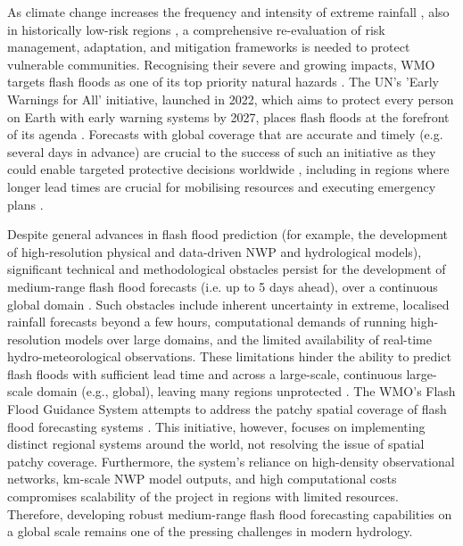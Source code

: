 As  climate change increases the frequency and intensity of extreme rainfall \citep{WMO_2025, IPCC_2023}, also in historically low-risk regions \citep{Fowler_2021c}, a comprehensive re-evaluation of risk management, adaptation, and mitigation frameworks is needed to protect vulnerable communities. Recognising their severe and growing impacts, WMO targets flash floods as one of its top priority natural hazards \citep{WMO_2025}. The UN's 'Early Warnings for All' initiative, launched in 2022, which aims to protect every person on Earth with early warning systems by 2027, places flash floods at the forefront of its agenda \citep{UN_2022}. Forecasts with global coverage that are accurate and timely (e.g. several days in advance) are crucial to the success of such an initiative as they could enable targeted protective decisions worldwide \citep{Merz_2020}, including in regions where longer lead times are crucial for mobilising resources and executing emergency plans \citep{Bazo_2019}. 

Despite  general advances in flash flood prediction (for example, the development of high-resolution physical and data-driven NWP and hydrological models), significant technical and methodological obstacles persist for the development of medium-range flash flood forecasts (i.e. up to 5 days ahead), over a continuous global domain \citep{Zanchetta_2020}. Such obstacles include inherent uncertainty in extreme, localised rainfall forecasts beyond a few hours, computational demands of running high-resolution models over large domains, and the limited availability of real-time hydro-meteorological observations. These limitations hinder the ability to predict flash floods with sufficient lead time and across a large-scale, continuous large-scale domain (e.g., global), leaving many regions unprotected \citep{AlRawas_2024}. The WMO's Flash Flood Guidance System attempts to address the patchy spatial coverage of flash flood forecasting systems \citep{Georgakakos_2022}. This initiative, however, focuses on implementing distinct regional systems around the world, not resolving the issue of spatial patchy coverage. Furthermore, the system's reliance on high-density observational networks, km-scale NWP model outputs, and high computational costs compromises scalability of the project in regions with limited resources. Therefore, developing robust medium-range flash flood forecasting capabilities on a global scale remains one of the pressing challenges in modern hydrology.

